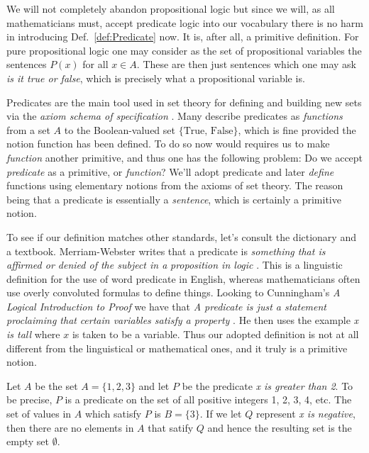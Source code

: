         We will not completely abandon propositional logic but since we will,
        as all mathematicians must, accept predicate logic into our vocabulary
        there is no harm in introducing Def.~\ref{def:Predicate} now. It is,
        after all, a primitive definition. For pure propositional logic one may
        consider as the set of propositional variables the sentences
        $P(x)$ for all $x\in{A}$. These are then just sentences which one may
        ask \textit{is it true or false}, which is precisely what a
        propositional variable is.
        \par\hfill\par
        Predicates are the main tool used in set theory for defining and
        building new sets via the \textit{axiom schema of specification}%
        . Many describe predicates as
        \textit{functions} from a set $A$ to the Boolean-valued set
        $\{\text{True},\,\text{False}\}$, which is fine provided the notion
        function has been defined. To do so now would requires us to make
        \textit{function} another primitive, and thus one has the following
        problem: Do we accept \textit{predicate} as a primitive, or
        \textit{function}? We'll adopt predicate and later \textit{define}
        functions using elementary notions from the axioms of set theory. The
        reason being that a predicate is essentially a \textit{sentence}, which
        is certainly a primitive notion.
        \par\hfill\par
        To see if our definition matches other standards, let's consult the
        dictionary and a textbook. Merriam-Webster writes that a predicate is
        \textit{something that is affirmed or denied of the subject in a}
        \textit{proposition in logic} \cite{MerriamWebsterPredicateDef}. This is
        a linguistic definition for the use of word predicate in English,
        whereas mathematicians often use overly convoluted formulas to define
        things. Looking to Cunningham's \textit{A Logical Introduction to Proof}
        we have that \textit{A predicate is just a statement proclaiming that}
        \textit{certain variables satisfy a property}
        \cite{Cunningham2010}. He then uses the example \textit{x is tall} where
        $x$ is taken to be a variable. Thus our adopted definition is not at all
        different from the linguistical or mathematical ones, and it truly is a
        primitive notion.
        \begin{example}
            Let $A$ be the set $A=\{1,2,3\}$ and let $P$ be the predicate
            \textit{x is greater than 2}. To be precise, $P$ is a predicate on
            the set of all positive integers 1, 2, 3, 4, etc. The set of values
            in $A$ which satisfy $P$ is $B=\{3\}$. If we let $Q$ represent
            \textit{x is negative}, then there are no elements in $A$ that
            satify $Q$ and hence the resulting set is the empty set $\emptyset$.
        \end{example}
